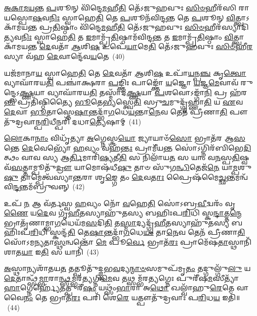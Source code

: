 \-\ul{𑌅}\-\-\ul{𑌕𑌾}\-\-\ul{𑌮}\-\-\ul{𑌯}\-\-\ul{𑌨𑍍𑌤} \ul{𑌪}\-𑌶𑍂𑌨𑍍 𑌵𑌿᳴𑌨𑍍𑌦𑍇\-\ul{𑌮}\-𑌹𑍀\-\ul{𑌤𑌿} 𑌤𑍇᳴\-𑌽𑌜𑍁𑌹𑌵𑍁𑌃 \ul{𑌸𑌿}\-\-\ul{𑍞}\-𑌹𑍀𑌰᳴𑌸𑌿 𑌰𑌾𑌯𑌸𑍍𑌪𑍋\-\ul{𑌷}\-𑌵\-\ul{𑌨𑌿𑌃} 𑌸𑍍𑌵𑌾𑌹𑍇\-\ul{𑌤𑌿} 𑌤𑍇 \ul{𑌪}\-𑌶𑍂𑌨᳴𑌵𑌿𑌨𑍍𑌦\-\ul{𑌨𑍍𑌤} 𑌤𑍇 \ul{𑌪}\-𑌶𑍂𑌨𑍍 \ul{𑌵𑌿}\-𑌤𑍍𑌤𑍍𑌵𑌾\-𑌽 𑌕𑌾᳴𑌮𑌯𑌨𑍍𑌤 𑌪𑍍𑌰\-\ul{𑌤𑌿}\-𑌷𑍍𑌠𑌾𑌂 𑌵𑌿᳴𑌨𑍍𑌦𑍇\-\ul{𑌮}\-𑌹𑍀\-\ul{𑌤𑌿} 𑌤𑍇᳴\-𑌽𑌜𑍁𑌹𑌵𑍁𑌃 \ul{𑌸𑌿}\-\-\ul{𑍞}\-𑌹𑍀𑌰᳴𑌸𑍍𑌯𑌾𑌦𑌿\-\ul{𑌤𑍍𑌯}\-𑌵\-\ul{𑌨𑌿𑌃} 𑌸𑍍𑌵𑌾𑌹𑍇\-\ul{𑌤𑌿} 𑌤 \ul{𑌇}\-𑌮𑌾𑌮𑍍𑌪𑍍𑌰᳴\-\ul{𑌤𑌿}\-𑌷𑍍𑌠𑌾𑌮᳴𑌵𑌿𑌨𑍍𑌦\-\ul{𑌨𑍍𑌤} 𑌤 \ul{𑌇}\-𑌮𑌾𑌮𑍍𑌪𑍍𑌰᳴\-\ul{𑌤𑌿}\-𑌷𑍍𑌠𑌾𑌂 \ul{𑌵𑌿}\-𑌤𑍍𑌤𑍍𑌵𑌾𑌕𑌾᳴𑌮𑌯𑌨𑍍𑌤 \ul{𑌦𑍇}\-𑌵𑌤𑌾᳴ \ul{𑌆}\-𑌶𑌿\-\ul{𑌷} 𑌉𑌪𑍇᳴\-\ul{𑌯𑌾}\-𑌮𑍇\-\ul{𑌤𑌿} 𑌤𑍇᳴\-𑌽𑌜𑍁𑌹𑌵𑍁𑌃 \ul{𑌸𑌿}\-\-\ul{𑍞}\-𑌹𑍀\-\ul{𑌰}\-𑌸𑍍𑌯𑌾 𑌵᳴𑌹 \ul{𑌦𑍇}\-𑌵𑌾𑌨𑍍𑌦𑍇᳴𑌵\-\ul{𑌯}\-𑌤𑍇~(40)

𑌯𑌜᳴𑌮𑌾𑌨𑌾\-\ul{𑌯} 𑌸𑍍𑌵𑌾𑌹𑍇\-\ul{𑌤𑌿} 𑌤𑍇 \ul{𑌦𑍇}\-𑌵𑌤𑌾᳴ \ul{𑌆}\-𑌶𑌿\-\ul{𑌷} 𑌉𑌪𑌾᳴\-\ul{𑌯}\-𑌨𑍍𑌪\-\ul{𑌞𑍍𑌚} 𑌕𑍃\-\ul{𑌤𑍍𑌵𑍋} 𑌵𑍍𑌯𑌾𑌘𑌾᳴𑌰𑌯\-\ul{𑌤𑌿} 𑌪𑌞𑍍𑌚𑌾॑𑌕𑍍𑌷𑌰𑌾 \ul{𑌪}\-𑌙𑍍𑌕𑍍𑌤𑌿𑌃 𑌪𑌾𑌙𑍍𑌕𑍍𑌤𑍋᳴ \ul{𑌯}\-𑌜𑍍𑌞𑍋 \ul{𑌯}\-𑌜𑍍𑌞\-\ul{𑌮𑍇}\-𑌵𑌾𑌵᳴ 𑌰𑍁𑌨𑍍𑌦𑍍𑌧𑍇\-𑌽\-\ul{𑌕𑍍𑌷𑍍𑌣}\-𑌯𑌾 𑌵𑍍𑌯𑌾𑌘𑌾᳴𑌰𑌯\-\ul{𑌤𑌿} 𑌤𑌸𑍍𑌮𑌾᳴𑌦\-\ul{𑌕𑍍𑌷𑍍𑌣}\-𑌯𑌾 \ul{𑌪}\-𑌶𑌵𑍋\-𑌽𑌙𑍍𑌗𑌾᳴\-\ul{𑌨𑌿} 𑌪𑍍𑌰 𑌹᳴𑌰\-\ul{𑌨𑍍𑌤𑌿} 𑌪𑍍𑌰𑌤𑌿᳴𑌷𑍍𑌠𑌿𑌤𑍍𑌯𑍈 \ul{𑌭𑍂}\-𑌤𑍇\-\ul{𑌭𑍍𑌯}\-𑌸𑍍𑌤𑍍𑌵𑍇\-\ul{𑌤𑌿} 𑌸𑍍𑌰𑍁\-\ul{𑌚}\-𑌮𑍁𑌦𑍍𑌗𑍃᳴𑌹𑍍𑌣𑌾\-\ul{𑌤𑌿} 𑌯 \ul{𑌏}\-𑌵 \ul{𑌦𑍇}\-𑌵𑌾 \ul{𑌭𑍂}\-𑌤𑌾𑌸𑍍𑌤𑍇\-\ul{𑌷𑌾}\-𑌨𑍍𑌤𑌦𑍍𑌭𑌾᳴\-\ul{𑌗}\-𑌧𑍇\-\ul{𑌯}\-𑌨𑍍𑌤𑌾\-\ul{𑌨𑍇}\-𑌵 𑌤𑍇𑌨᳴ 𑌪𑍍𑌰𑍀𑌣𑌾\-\ul{𑌤𑌿} 𑌪𑍗𑌤𑍁᳴𑌦𑍍𑌰𑌵𑌾𑌨𑍍𑌪\-\ul{𑌰𑌿}\-𑌧𑍀𑌨𑍍𑌪𑌰𑌿᳴ 𑌦𑌧𑌾\-\ul{𑌤𑍍𑌯𑍇}\-𑌷𑌾𑌮𑍍~(41)

\-\ul{𑌲𑍋}\-𑌕𑌾\-\ul{𑌨𑌾𑌂} 𑌵𑌿𑌧𑍃᳴𑌤𑍍𑌯𑌾 \ul{𑌅}\-𑌗𑍍𑌨𑍇𑌸𑍍𑌤𑍍𑌰\-\ul{𑌯𑍋} 𑌜𑍍𑌯𑌾𑌯𑌾𑍞᳴\-\ul{𑌸𑍋} 𑌭𑍍𑌰𑌾𑌤᳴𑌰 𑌆\-\ul{𑌸}\-𑌨𑍍𑌤𑍇 \ul{𑌦𑍇}\-𑌵𑍇𑌭𑍍𑌯𑍋᳴ \ul{𑌹}\-𑌵𑍍𑌯𑌂 𑌵𑌹᳴\-\ul{𑌨𑍍𑌤𑌃} 𑌪𑍍𑌰𑌾𑌮𑍀᳴𑌯\-\ul{𑌨𑍍𑌤} 𑌸𑍋॑\-𑌽𑌗𑍍𑌨𑌿𑌰᳴𑌬𑌿𑌭𑍇\-\ul{𑌦𑌿}\-𑌤𑍍𑌥𑌂 𑌵𑌾𑌵 𑌸𑍍𑌯 𑌆\-\ul{𑌰𑍍𑌤𑌿}\-𑌮𑌾𑌰𑌿᳴\-\ul{𑌷𑍍𑌯}\-𑌤𑍀\-\ul{𑌤𑌿} 𑌸 𑌨𑌿𑌲𑌾᳴𑌯\-\ul{𑌤} 𑌸 𑌯𑌾𑌂 𑌵\-\ul{𑌨}\-𑌸𑍍𑌪\-\ul{𑌤𑌿}\-𑌷𑍍𑌵𑌵᳴\-\ul{𑌸}\-𑌤𑍍𑌤𑌾𑌮𑍍𑌪𑍂𑌤𑍁᳴\-\ul{𑌦𑍍𑌰𑍗} 𑌯𑌾𑌮𑍋𑌷᳴𑌧𑍀\-\ul{𑌷𑍁} 𑌤𑌾𑍞 𑌸𑍁᳴𑌗\-\ul{𑌨𑍍𑌧𑌿}\-𑌤𑍇𑌜᳴\-\ul{𑌨𑍇} 𑌯𑌾\-\ul{𑌮𑍍𑌪}\-𑌶𑍁\-\ul{𑌷𑍁} 𑌤𑌾𑌮𑍍𑌪𑍇𑌤𑍍𑌵᳴𑌸𑍍𑌯𑌾\-\ul{𑌨𑍍𑌤}\-𑌰𑌾 𑌶𑍃\-\ul{𑌙𑍍𑌗𑍇} 𑌤𑌂 \ul{𑌦𑍇}\-𑌵\-\ul{𑌤𑌾𑌃} 𑌪𑍍𑌰𑍈𑌷᳴𑌮𑍈\-\ul{𑌚𑍍𑌛}\-𑌨𑍍𑌤𑌮𑌨𑍍𑌵᳴𑌵𑌿\-\ul{𑌨𑍍𑌦}\-𑌨𑍍𑌤𑌮᳴𑌬𑍍𑌰𑍁𑌵𑌨𑍍𑌨𑍍~(42)

𑌉𑌪᳴ \ul{𑌨} 𑌆 𑌵᳴𑌰𑍍𑌤𑌸𑍍𑌵 \ul{𑌹}\-𑌵𑍍𑌯𑌂 𑌨𑍋᳴ \ul{𑌵}\-𑌹𑍇\-\ul{𑌤𑌿} 𑌸𑍋॑\-𑌽𑌬𑍍𑌰\-\ul{𑌵𑍀}\-𑌦𑍍𑌵𑌰𑌂᳴ 𑌵𑍃\-\ul{𑌣𑍈} 𑌯\-\ul{𑌦𑍇}\-𑌵 𑌗𑍃᳴\-\ul{𑌹𑍀}\-𑌤𑌸𑍍𑌯𑌾𑌹𑍁᳴𑌤𑌸𑍍𑌯 𑌬𑌹𑌿𑌃𑌪\-\ul{𑌰𑌿}\-𑌧𑌿 𑌸𑍍𑌕\-\ul{𑌨𑍍𑌦𑌾}\-𑌤𑍍𑌤\-\ul{𑌨𑍍𑌮𑍇} 𑌭𑍍𑌰𑌾𑌤𑍃᳴𑌣𑌾𑌮𑍍𑌭𑌾\-\ul{𑌗}\-𑌧𑍇𑌯᳴𑌮\-\ul{𑌸}\-𑌦𑌿\-\ul{𑌤𑌿} 𑌤\-\ul{𑌸𑍍𑌮𑌾}\-𑌦𑍍𑌯𑌦𑍍𑌗𑍃᳴\-\ul{𑌹𑍀}\-𑌤𑌸𑍍𑌯𑌾𑌹𑍁᳴𑌤𑌸𑍍𑌯 𑌬𑌹𑌿𑌃𑌪\-\ul{𑌰𑌿}\-𑌧𑌿 𑌸𑍍𑌕𑌨𑍍𑌦᳴\-\ul{𑌤𑌿} 𑌤𑍇\-\ul{𑌷𑌾}\-𑌨𑍍𑌤𑌦𑍍𑌭𑌾᳴\-\ul{𑌗}\-𑌧𑍇\-\ul{𑌯𑌂} 𑌤𑌾\-\ul{𑌨𑍇}\-𑌵 𑌤𑍇𑌨᳴ 𑌪𑍍𑌰𑍀𑌣𑌾\-\ul{𑌤𑌿} 𑌸𑍋᳴\-𑌽𑌮𑌨𑍍𑌯𑌤𑌾\-\ul{𑌸𑍍𑌥}\-𑌨𑍍𑌵𑌨𑍍𑌤𑍋᳴ \ul{𑌮𑍇} 𑌪𑍂\-\ul{𑌰𑍍𑌵𑍇} 𑌭𑍍𑌰𑌾𑌤᳴\-\ul{𑌰𑌃} 𑌪𑍍𑌰𑌾𑌮𑍇᳴𑌷\-\ul{𑌤𑌾}\-𑌸𑍍𑌥𑌾𑌨𑌿᳴ 𑌶𑌾𑌤\-\ul{𑌯𑌾} 𑌇\-\ul{𑌤𑌿} 𑌸 𑌯𑌾𑌨𑌿᳴~(43)

\-\ul{𑌅}\-𑌸𑍍𑌥𑌾𑌨𑍍𑌯𑌶𑌾᳴𑌤𑌯\-\ul{𑌤} 𑌤𑌤𑍍𑌪𑍂𑌤𑍁᳴𑌦𑍍𑌰𑍍𑌵𑌭\-\ul{𑌵}\-𑌦𑍍𑌯\-\ul{𑌨𑍍𑌮𑌾}\-\-\ul{𑍞}\-𑌸𑌮𑍁𑌪᳴𑌮𑍃\-\ul{𑌤𑌂} 𑌤𑌦𑍍𑌗𑍁𑌲𑍍𑌗𑍁᳴\-\ul{𑌲𑍁} 𑌯\-\ul{𑌦𑍇}\-𑌤𑌾𑌨𑍍𑌥𑍍𑌸᳴\-\ul{𑌮𑍍𑌭𑌾}\-𑌰𑌾\-\ul{𑌨𑍍𑌥𑍍𑌸}\-𑌮𑍍𑌭𑌰᳴\-\ul{𑌤𑍍𑌯}\-𑌗𑍍𑌨𑌿\-\ul{𑌮𑍇}\-𑌵 𑌤𑌥𑍍𑌸𑌮𑍍𑌭᳴𑌰\-\ul{𑌤𑍍𑌯}\-𑌗𑍍𑌨𑍇𑌃 𑌪𑍁𑌰𑍀᳴𑌷\-\ul{𑌮}\-𑌸𑍀𑌤𑍍𑌯𑌾᳴\-\ul{𑌹𑌾}\-𑌗𑍍𑌨𑍇𑌰𑍍\mbox{}𑌹𑍍𑌯𑍇᳴𑌤𑌤𑍍𑌪𑍁𑌰𑍀᳴\-\ul{𑌷𑌂} 𑌯𑌥𑍍𑌸𑌂᳴\-\ul{𑌭𑌾}\-𑌰𑌾 𑌅\-\ul{𑌥𑍋} 𑌖𑌲𑍍𑌵𑌾᳴𑌹𑍁\-\ul{𑌰𑍇}\-𑌤𑍇 𑌵𑌾𑌵𑍈\-\ul{𑌨𑌂} 𑌤𑍇 𑌭𑍍𑌰𑌾𑌤᳴\-\ul{𑌰𑌃} 𑌪𑌰𑌿᳴ 𑌶𑍇\-\ul{𑌰𑍇} 𑌯𑌤𑍍𑌪𑍗𑌤𑍁᳴𑌦𑍍𑌰𑌵𑌾𑌃 𑌪\-\ul{𑌰𑌿}\-𑌧\-\ul{𑌯} 𑌇𑌤𑌿᳴॥~(44)

